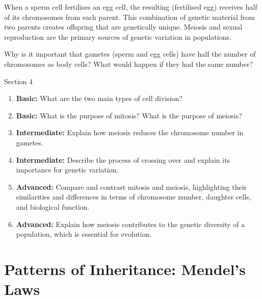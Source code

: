 When a sperm cell fertilises an egg cell, the resulting  (fertilised egg) receives half of its chromosomes from each parent.  This combination of genetic material from two parents creates offspring that are genetically unique.  Meiosis and sexual reproduction are the primary sources of genetic variation in populations.

\begin{marginnote}
\end{marginnote}

\begin{stopandthink}
Why is it important that gametes (sperm and egg cells) have half the number of chromosomes as body cells? What would happen if they had the same number?
\end{stopandthink}

\begin{tieredquestions}{Section 4}

\begin{enumerate}
    \item \textbf{Basic:} What are the two main types of cell division?
    \item \textbf{Basic:} What is the purpose of mitosis? What is the purpose of meiosis?
    \item \textbf{Intermediate:} Explain how meiosis reduces the chromosome number in gametes.
    \item \textbf{Intermediate:} Describe the process of crossing over and explain its importance for genetic variation.
    \item \textbf{Advanced:} Compare and contrast mitosis and meiosis, highlighting their similarities and differences in terms of chromosome number, daughter cells, and biological function.
    \item \textbf{Advanced:} Explain how meiosis contributes to the genetic diversity of a population, which is essential for evolution.
\end{enumerate}

\end{tieredquestions}


\section{Patterns of Inheritance: Mendel's Laws}

